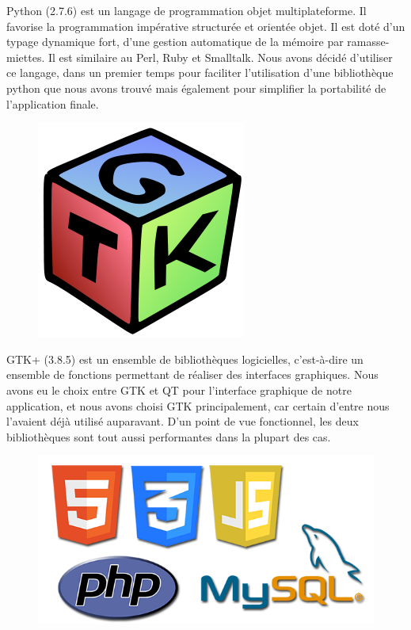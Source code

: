 \documentclass[17pts]{report}
\begin{document}
Python (2.7.6) est un langage de programmation objet multiplateforme.  Il
favorise la programmation impérative structurée et orientée objet. Il est doté
d'un typage dynamique fort, d'une gestion automatique de la mémoire par
ramasse-miettes. Il est similaire au Perl, Ruby et Smalltalk.  Nous avons
décidé d'utiliser ce langage, dans un premier temps pour faciliter
l'utilisation d'une bibliothèque python que nous avons trouvé mais également
pour simplifier la portabilité de l'application finale.\\

\begin{figure}[H]
    \includegraphics[scale=0.2]{illustrations/gtk.png}
    \centering
\end{figure}

GTK+ (3.8.5) est un ensemble de bibliothèques logicielles, c'est-à-dire un
ensemble de fonctions permettant de réaliser des interfaces graphiques.  Nous
avons eu le choix entre GTK et QT pour l'interface graphique de notre
application, et nous avons choisi GTK principalement, car certain d'entre nous
l'avaient déjà utilisé auparavant. D'un point de vue fonctionnel, les deux
bibliothèques sont tout aussi performantes dans la plupart des cas.\\

\begin{figure}[H]
    \includegraphics[scale=0.3]{illustrations/html-css-js-php-mysql.png}
    \centering
\end{figure}
\end{document}

